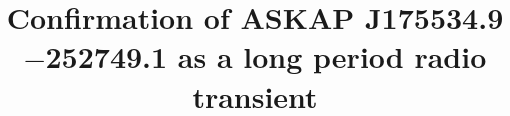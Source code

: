 \documentclass[preprint2,linenumbers]{aastex631}
\newcommand{\srcfull}{ASKAP J175534.9$-$252749.1}
\begin{document}
\title{Confirmation of \srcfull{} as a long period radio transient}


\end{document}
